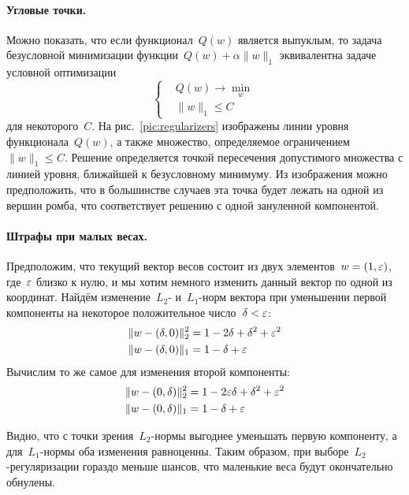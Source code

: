 \documentclass[12pt,fleqn]{article}
\begin{document}
\paragraph{Угловые точки.}
Можно показать, что если функционал~$Q(w)$ является выпуклым,
то задача безусловной минимизации функции~$Q(w) + \alpha \|w\|_1$
эквивалентна задаче условной оптимизации
\[
    \left\{
        \begin{aligned}
            & Q(w) \to \min_{w} \\
            & \|w\|_1 \leq C
        \end{aligned}
    \right.
\]
для некоторого~$C$.
На рис.~\ref{pic:regularizers}
изображены линии уровня функционала~$Q(w)$,
а также множество, определяемое ограничением~$\|w\|_1 \leq C$.
Решение определяется точкой пересечения допустимого множества с линией уровня,
ближайшей к безусловному минимуму.
Из изображения можно предположить, что в большинстве случаев эта точка будет лежать на одной из вершин ромба,
что соответствует решению с одной зануленной компонентой.

\paragraph{Штрафы при малых весах.}
Предположим, что текущий вектор весов состоит из двух элементов~$w = (1, \varepsilon)$,
где~$\varepsilon$ близко к нулю,
и мы хотим немного изменить данный вектор по одной из координат.
Найдём изменение~$L_2$- и~$L_1$-норм вектора при уменьшении первой компоненты на некоторое
положительное число~$\delta < \varepsilon$:
\begin{align*}
    &\|w - (\delta, 0)\|_2^2
    =
    1 - 2 \delta + \delta^2 + \varepsilon^2\\
    &\|w - (\delta, 0)\|_1
    =
    1 - \delta + \varepsilon
\end{align*}
Вычислим то же самое для изменения второй компоненты:
\begin{align*}
    &\|w - (0, \delta)\|_2^2
    =
    1 - 2 \varepsilon \delta + \delta^2 + \varepsilon^2\\
    &\|w - (0, \delta)\|_1
    =
    1 - \delta + \varepsilon
\end{align*}

Видно, что с точки зрения~$L_2$-нормы выгоднее уменьшать первую компоненту,
а для~$L_1$-нормы оба изменения равноценны.
Таким образом, при выборе~$L_2$-регуляризации гораздо меньше шансов,
что маленькие веса будут окончательно обнулены.
\end{document}
